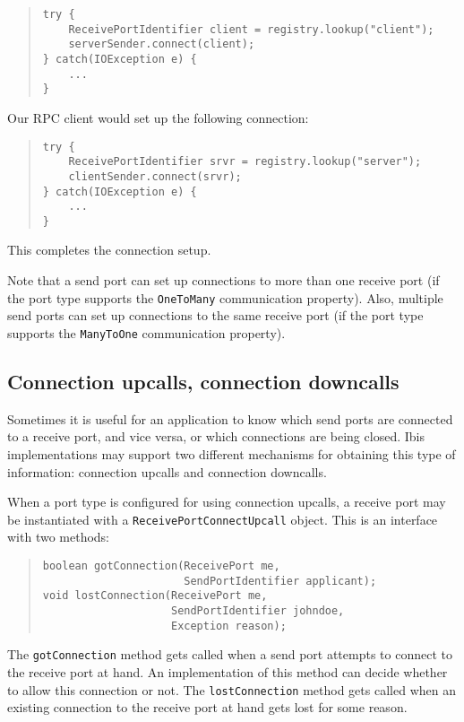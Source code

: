 \documentclass[10pt]{article}
\newcommand{\mysubsection}[1]{\subsection{#1}\label{#1}}
\begin{document}
\begin{quote}
\begin{verbatim}
try {
    ReceivePortIdentifier client = registry.lookup("client");
    serverSender.connect(client);
} catch(IOException e) {
    ...
}
\end{verbatim}
\end{quote}

Our RPC client would set up the following connection:

\begin{quote}
\begin{verbatim}
try {
    ReceivePortIdentifier srvr = registry.lookup("server");
    clientSender.connect(srvr);
} catch(IOException e) {
    ...
}
\end{verbatim}
\end{quote}

This completes the connection setup.

Note that a send port can set up connections to more than one
receive port (if the port type supports the \verb+OneToMany+
communication property). Also, multiple send ports can set up
connections to the same receive port (if the port type supports
the \verb+ManyToOne+ communication property).

\mysubsection{Connection upcalls, connection downcalls}

Sometimes it is useful for an application to know which send ports
are connected to a receive port, and vice versa, or which connections
are being closed.
Ibis implementations may support two different mechanisms for obtaining
this type of information: connection upcalls and connection downcalls.

When a port type is configured for using connection upcalls,
a receive port may be instantiated with a \verb+ReceivePortConnectUpcall+
object. This is an interface with two methods:

\begin{quote}
\begin{verbatim}
boolean gotConnection(ReceivePort me,
                      SendPortIdentifier applicant);
void lostConnection(ReceivePort me,
                    SendPortIdentifier johndoe,
                    Exception reason);
\end{verbatim}
\end{quote}
\noindent 
The \verb+gotConnection+ method gets called when a send port attempts
to connect to the receive port at hand.
An implementation of this method can decide whether
to allow this connection or not.
The \verb+lostConnection+ method gets called when an existing connection
to the receive port at hand gets lost for some reason.
\end{document}
